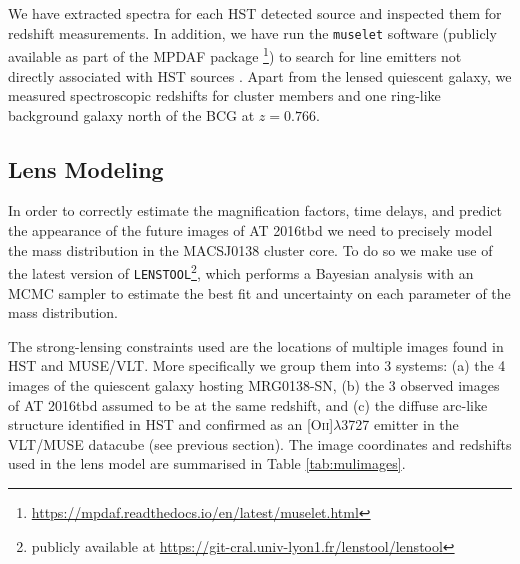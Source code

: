 \documentclass[12pt]{article}
\def\SNABC{AT 2016tbd\xspace}
\def\lenstool{{\tt LENSTOOL}\xspace}
\begin{document}
We have extracted spectra for each HST detected source and inspected them for redshift measurements. In addition, we have run the {\tt muselet} software (publicly available as part of the MPDAF package \cite{piqueras_mpdaf_2019}\footnote{\url{https://mpdaf.readthedocs.io/en/latest/muselet.html}}) to search for line emitters not directly associated with HST sources \cite{mahler_strong_2018,lagattuta_probing_2019}. Apart from the lensed quiescent galaxy, we measured spectroscopic redshifts for cluster members and one ring-like background galaxy north of the BCG at $z=0.766$.

\subsection*{Lens Modeling}

In order to correctly estimate the magnification factors, time delays, and predict the appearance of the future images of \SNABC we need to precisely model the mass distribution in the MACSJ0138 cluster core. To do so we make use of the latest version of \lenstool \cite{jullo_bayesian_2007}\footnote{publicly available at \url{ https://git-cral.univ-lyon1.fr/lenstool/lenstool}}, which performs a Bayesian analysis with an MCMC sampler to estimate the best fit and uncertainty on each parameter of the mass distribution. 

The strong-lensing constraints used are the locations of multiple images found in HST and MUSE/VLT. More specifically we group them into 3 systems: (a) the 4 images of the quiescent galaxy hosting MRG0138-SN, (b) the 3 observed images of \SNABC assumed to be at the same redshift, and (c) the diffuse arc-like structure identified in HST and confirmed as an [O\textsc{ii}]$\lambda$3727 emitter in the VLT/MUSE datacube (see previous section). The image coordinates and redshifts used in the lens model are summarised in Table \ref{tab:mulimages}.
\end{document}
